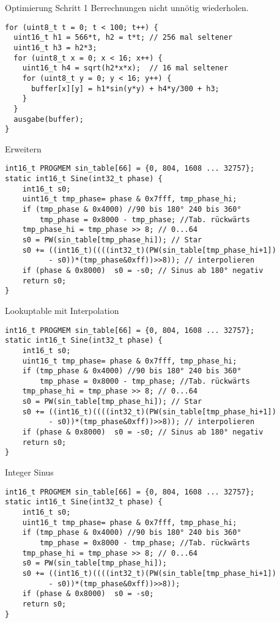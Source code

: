 \documentclass{beamer}
\begin{document}
\begin{frame}[fragile]{Optimierung Schritt 1}
Berrechnungen nicht unnötig wiederholen.
\begin{verbatim}
for (uint8_t t = 0; t < 100; t++) {
  uint16_t h1 = 566*t, h2 = t*t; // 256 mal seltener
  uint16_t h3 = h2*3; 
  for (uint8_t x = 0; x < 16; x++) {
    uint16_t h4 = sqrt(h2*x*x);  // 16 mal seltener
    for (uint8_t y = 0; y < 16; y++) {
      buffer[x][y] = h1*sin(y*y) + h4*y/300 + h3;
    }
  }
  ausgabe(buffer);
}
\end{verbatim}
\end{frame}

\begin{frame}[fragile]{Erweitern}
\begin{verbatim}
int16_t PROGMEM sin_table[66] = {0, 804, 1608 ... 32757};
static int16_t Sine(int32_t phase) {
    int16_t s0;
    uint16_t tmp_phase= phase & 0x7fff, tmp_phase_hi;
    if (tmp_phase & 0x4000) //90 bis 180° 240 bis 360° 
        tmp_phase = 0x8000 - tmp_phase; //Tab. rückwärts
    tmp_phase_hi = tmp_phase >> 8; // 0...64
    s0 = PW(sin_table[tmp_phase_hi]); // Star
    s0 += ((int16_t)((((int32_t)(PW(sin_table[tmp_phase_hi+1]) 
          - s0))*(tmp_phase&0xff))>>8)); // interpolieren
    if (phase & 0x8000)  s0 = -s0; // Sinus ab 180° negativ
    return s0;
}
\end{verbatim}
\end{frame}

\begin{frame}[fragile]{Lookuptable mit Interpolation}
\begin{verbatim}
int16_t PROGMEM sin_table[66] = {0, 804, 1608 ... 32757};
static int16_t Sine(int32_t phase) {
    int16_t s0;
    uint16_t tmp_phase= phase & 0x7fff, tmp_phase_hi;
    if (tmp_phase & 0x4000) //90 bis 180° 240 bis 360° 
        tmp_phase = 0x8000 - tmp_phase; //Tab. rückwärts
    tmp_phase_hi = tmp_phase >> 8; // 0...64
    s0 = PW(sin_table[tmp_phase_hi]); // Star
    s0 += ((int16_t)((((int32_t)(PW(sin_table[tmp_phase_hi+1]) 
          - s0))*(tmp_phase&0xff))>>8)); // interpolieren
    if (phase & 0x8000)  s0 = -s0; // Sinus ab 180° negativ
    return s0;
}
\end{verbatim}
\end{frame}

\begin{frame}[fragile]{Integer Sinus}
\begin{verbatim}
int16_t PROGMEM sin_table[66] = {0, 804, 1608 ... 32757};
static int16_t Sine(int32_t phase) {
    int16_t s0;
    uint16_t tmp_phase= phase & 0x7fff, tmp_phase_hi;
    if (tmp_phase & 0x4000) //90 bis 180° 240 bis 360° 
        tmp_phase = 0x8000 - tmp_phase; //Tab. rückwärts
    tmp_phase_hi = tmp_phase >> 8; // 0...64
    s0 = PW(sin_table[tmp_phase_hi]);
    s0 += ((int16_t)((((int32_t)(PW(sin_table[tmp_phase_hi+1]) 
          - s0))*(tmp_phase&0xff))>>8));
    if (phase & 0x8000)  s0 = -s0;
    return s0;
}
\end{verbatim}
\end{frame}
\end{document}
